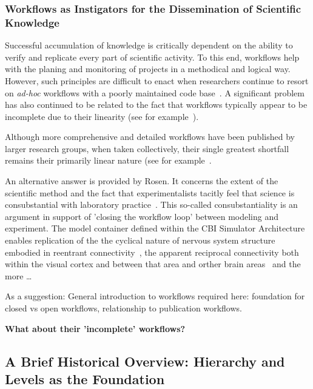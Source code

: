 \documentclass[10pt,letterpaper]{article}
\begin{document}
\subsubsection*{Workflows as Instigators for the Dissemination of Scientific Knowledge}

Successful accumulation of knowledge is critically dependent on the ability to verify and replicate every part of scientific activity. To this end, workflows help with the planing and monitoring of projects in a methodical and logical way.  However, such principles are difficult to enact when researchers continue to resort on {\textit{ad-hoc}} workflows with a poorly maintained code base~\cite{kubilius13}. A significant problem has also continued to be related to the fact that workflows typically appear to be incomplete due to their linearity (see for example~\cite{eriksson22,stockton15}).

Although more comprehensive and detailed workflows have been published by larger research groups, when taken collectively, their single greatest shortfall remains their primarily linear nature (see for example~\cite{levenstein23,fan19}.

An alternative answer is provided by Rosen. It concerns the extent of the scientific method and the fact 
that experimentalists tacitly feel that science is consubstantial with laboratory practice~\cite{rosen96}. This so-called consubstantiality is an argument in support of 'closing the workflow loop' between modeling and experiment. The model container defined within the CBI Simulator Architecture enables replication of the the cyclical nature of nervous system structure embodied in reentrant connectivity~\cite{edelman13}, the apparent reciprocal connectivity both within the visual cortex and between that area and orther brain areas~\cite{vanessen93} and the more \ldots

As a suggestion: General introduction to workflows required here: foundation for closed vs open workflows, relationship to publication workflows.

{\bf What about their 'incomplete' workflows?}

\subsection*{A Brief Historical Overview: Hierarchy and Levels as the Foundation}
\end{document}
